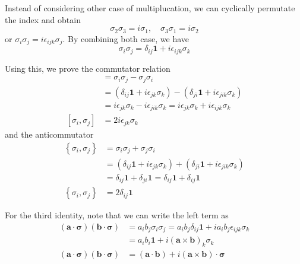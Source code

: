 \documentclass[../../../main.tex]{subfiles}
\begin{document}
Instead of considering other case of multiplucation, we can cyclically permutate the index and obtain
\begin{equation*}
    \sigma_2 \sigma_3 = i \sigma_1, \quad \sigma_3 \sigma_1 = i \sigma_2
\end{equation*}
or $\sigma_{i}\sigma_j=i\epsilon_{ijk}\sigma_j$.
By combining both case, we have
\begin{equation*}
    \sigma_i \sigma_j = \delta_{ij} \mathbf{1} + i \epsilon_{ijk} \sigma_k
\end{equation*}

Using this, we prove the commutator relation
\begin{align*}
    [\sigma_i,\sigma_j]
     & =   \sigma_i \sigma_j - \sigma_j \sigma_i                                                                    \\
     & = (\delta_{ij} \mathbf{1} + i \epsilon_{jk} \sigma_k) - (\delta_{ji} \mathbf{1} + i \epsilon_{jik} \sigma_k) \\
     & =i \epsilon_{jk} \sigma_k - i \epsilon_{jik} \sigma_k = i \epsilon_{jk} \sigma_k + i \epsilon_{ijk} \sigma_k \\
    [\sigma_i,\sigma_j]
     & = 2i \epsilon_{jk} \sigma_k
\end{align*}
and the anticommutator
\begin{align*}
    \left\{ \sigma_i,\sigma_j \right\}
     & =   \sigma_i \sigma_j + \sigma_j \sigma_i                                                                    \\
     & = (\delta_{ij} \mathbf{1} + i \epsilon_{jk} \sigma_k) + (\delta_{ji} \mathbf{1} + i \epsilon_{jik} \sigma_k) \\
     & =\delta_{ij} \mathbf{1} + \delta_{ji} \mathbf{1} = \delta_{ij} \mathbf{1} + \delta_{ij} \mathbf{1}           \\
    \left\{ \sigma_i,\sigma_j \right\}
     & = 2 \delta_{ij} \mathbf{1}
\end{align*}

For the third identity, note that we can write the left term as
\begin{align*}
    (\mathbf{a} \cdot \boldsymbol{\sigma})(\mathbf{b} \cdot \boldsymbol{\sigma})
     & =  a_i b_j \sigma_i \sigma_j =     a_i b_j\delta_{ij} \mathbf{1} + ia_i b_j \epsilon_{ijk} \sigma_k \\
     & =  a_i b_i \mathbf{1} + i (\mathbf{a }\times \mathbf{b })_k \sigma_k                                \\
    (\mathbf{a} \cdot \boldsymbol{\sigma})(\mathbf{b} \cdot \boldsymbol{\sigma})
     & = (\mathbf{a }\cdot \mathbf{b }) + i (\mathbf{a }\times \mathbf{b } )\cdot \boldsymbol{\sigma}
\end{align*}
\end{document}
